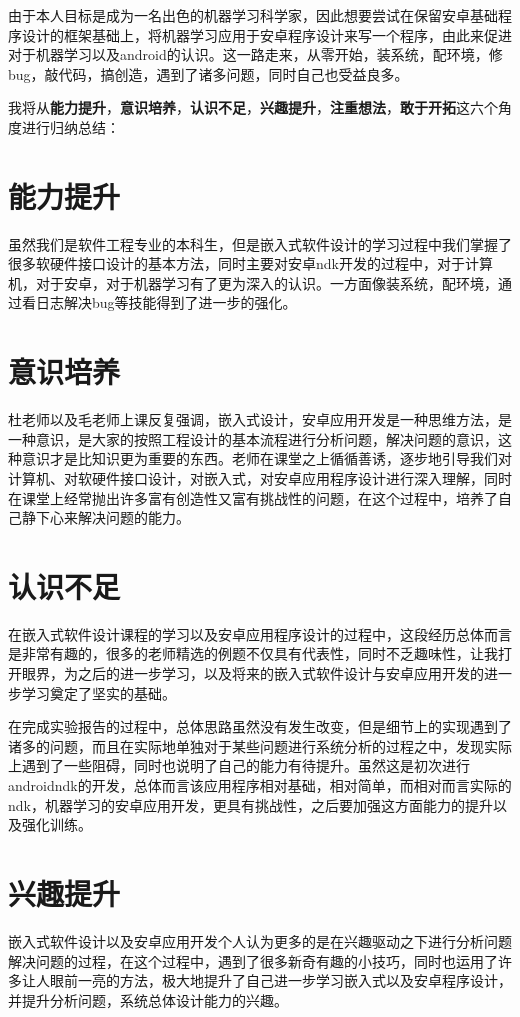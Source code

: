 \documentclass[UTF8, Microsoft YaHei]{book}
\begin{document}
    由于本人目标是成为一名出色的机器学习科学家，因此想要尝试在保留安卓基础程序设计的框架基础上，将机器学习应用于安卓程序设计来写一个程序，由此来促进对于机器学习以及android的认识。这一路走来，从零开始，装系统，配环境，修bug，敲代码，搞创造，遇到了诸多问题，同时自己也受益良多。

    我将从\textbf{能力提升}，\textbf{意识培养}，\textbf{认识不足}，\textbf{兴趣提升}，\textbf{注重想法}，\textbf{敢于开拓}这六个角度进行归纳总结：

    \section{能力提升}
    虽然我们是软件工程专业的本科生，但是嵌入式软件设计的学习过程中我们掌握了很多软硬件接口设计的基本方法，同时主要对安卓ndk开发的过程中，对于计算机，对于安卓，对于机器学习有了更为深入的认识。一方面像装系统，配环境，通过看日志解决bug等技能得到了进一步的强化。

    \section{意识培养}
    杜老师以及毛老师上课反复强调，嵌入式设计，安卓应用开发是一种思维方法，是一种意识，是大家的按照工程设计的基本流程进行分析问题，解决问题的意识，这种意识才是比知识更为重要的东西。老师在课堂之上循循善诱，逐步地引导我们对计算机、对软硬件接口设计，对嵌入式，对安卓应用程序设计进行深入理解，同时在课堂上经常抛出许多富有创造性又富有挑战性的问题，在这个过程中，培养了自己静下心来解决问题的能力。

    \section{认识不足}
    在嵌入式软件设计课程的学习以及安卓应用程序设计的过程中，这段经历总体而言是非常有趣的，很多的老师精选的例题不仅具有代表性，同时不乏趣味性，让我打开眼界，为之后的进一步学习，以及将来的嵌入式软件设计与安卓应用开发的进一步学习奠定了坚实的基础。

    在完成实验报告的过程中，总体思路虽然没有发生改变，但是细节上的实现遇到了诸多的问题，而且在实际地单独对于某些问题进行系统分析的过程之中，发现实际上遇到了一些阻碍，同时也说明了自己的能力有待提升。虽然这是初次进行androidndk的开发，总体而言该应用程序相对基础，相对简单，而相对而言实际的ndk，机器学习的安卓应用开发，更具有挑战性，之后要加强这方面能力的提升以及强化训练。

    \section{兴趣提升}
    嵌入式软件设计以及安卓应用开发个人认为更多的是在兴趣驱动之下进行分析问题解决问题的过程，在这个过程中，遇到了很多新奇有趣的小技巧，同时也运用了许多让人眼前一亮的方法，极大地提升了自己进一步学习嵌入式以及安卓程序设计，并提升分析问题，系统总体设计能力的兴趣。
\end{document}
